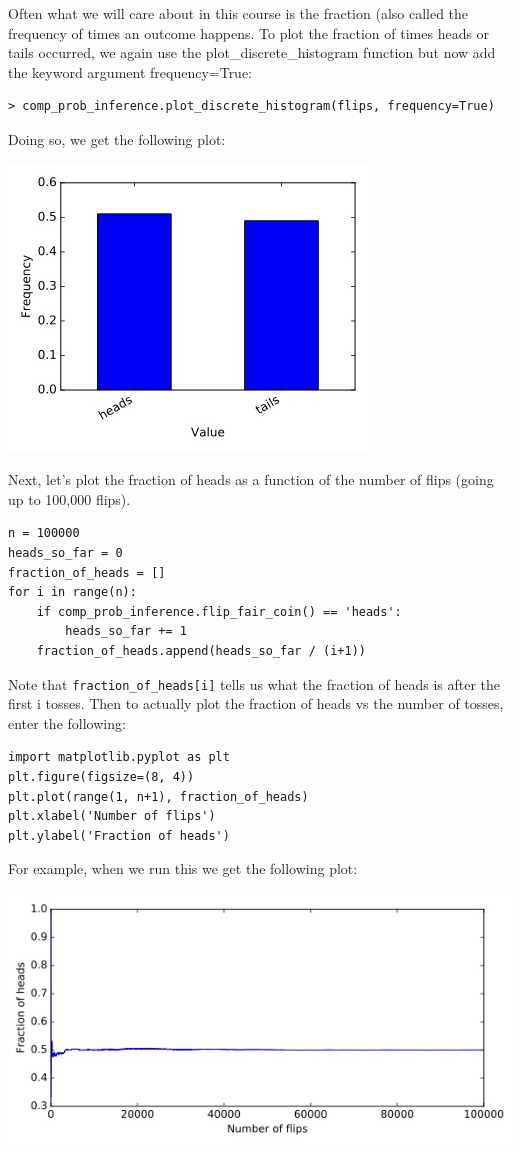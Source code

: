 \documentclass[6008notes.tex]{subfiles}
\begin{document}
Often what we will care about in this course is the fraction (also called the frequency of times an outcome happens. To plot the fraction of times heads or tails occurred, we again use the plot\_discrete\_histogram function but now add the keyword argument frequency=True:

\begin{lstlisting}
> comp_prob_inference.plot_discrete_histogram(flips, frequency=True)
\end{lstlisting}

Doing so, we get the following plot:

\includegraphics[scale=0.4]{images_sec-intro-histogram-frequencies}


Next, let's plot the fraction of heads as a function of the number of flips (going up to 100,000 flips).

\begin{lstlisting}
n = 100000
heads_so_far = 0
fraction_of_heads = []
for i in range(n):
    if comp_prob_inference.flip_fair_coin() == 'heads':
        heads_so_far += 1
    fraction_of_heads.append(heads_so_far / (i+1))
\end{lstlisting}
Note that \texttt{fraction\_of\_heads[i]} tells us what the fraction of heads is after the first i tosses. Then to actually plot the fraction of heads vs the number of tosses, enter the following:

\begin{lstlisting}
import matplotlib.pyplot as plt
plt.figure(figsize=(8, 4))
plt.plot(range(1, n+1), fraction_of_heads)
plt.xlabel('Number of flips')
plt.ylabel('Fraction of heads')
\end{lstlisting}

For example, when we run this we get the following plot:

\includegraphics[scale=0.4]{images_sec-intro-frequency-of-heads-vs-number-of-flips}
\end{document}
